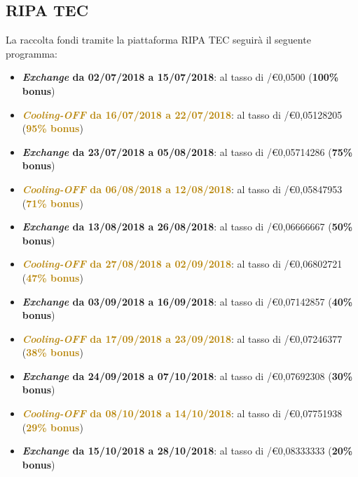 \subsection{RIPA TEC}
La raccolta fondi tramite la piattaforma RIPA TEC seguirà il seguente programma:
\begin{itemize}
	\item \textcolor{airforceblue}{\textbf{\textit{Exchange} da 02/07/2018 a 15/07/2018}}: al tasso di \PHP/\euro0,0500 (\textcolor{airforceblue}{\textbf{100\% bonus}})
	\item \textcolor{darkgoldenrod}{\textbf{\textit{Cooling-OFF} da 16/07/2018 a 22/07/2018}}: 
	al tasso di \PHP/\euro0,05128205 (\textcolor{darkgoldenrod}{\textbf{95\% bonus}})
	\item \textcolor{airforceblue}{\textbf{\textit{Exchange} da 23/07/2018 a 05/08/2018}}: al tasso di \PHP/\euro0,05714286 (\textcolor{airforceblue}{\textbf{75\% bonus}})
	\item \textcolor{darkgoldenrod}{\textbf{\textit{Cooling-OFF} da 06/08/2018 a 12/08/2018}}: 
	al tasso di \PHP/\euro0,05847953 (\textcolor{darkgoldenrod}{\textbf{71\% bonus}})
	\item \textcolor{airforceblue}{\textbf{\textit{Exchange} da 13/08/2018 a 26/08/2018}}: al tasso di \PHP/\euro0,06666667 (\textcolor{airforceblue}{\textbf{50\% bonus}})
	\item \textcolor{darkgoldenrod}{\textbf{\textit{Cooling-OFF} da 27/08/2018 a 02/09/2018}}: 
	al tasso di \PHP/\euro0,06802721 (\textcolor{darkgoldenrod}{\textbf{47\% bonus}})
	\item \textcolor{airforceblue}{\textbf{\textit{Exchange} da 03/09/2018 a 16/09/2018}}: al tasso di \PHP/\euro0,07142857 (\textcolor{airforceblue}{\textbf{40\% bonus}})
	\item \textcolor{darkgoldenrod}{\textbf{\textit{Cooling-OFF} da 17/09/2018 a 23/09/2018}}: 
	al tasso di \PHP/\euro0,07246377 (\textcolor{darkgoldenrod}{\textbf{38\% bonus}})
	\item \textcolor{airforceblue}{\textbf{\textit{Exchange} da 24/09/2018 a 07/10/2018}}: al tasso di \PHP/\euro0,07692308 (\textcolor{airforceblue}{\textbf{30\% bonus}})
	\item \textcolor{darkgoldenrod}{\textbf{\textit{Cooling-OFF} da 08/10/2018 a 14/10/2018}}: 
	al tasso di \PHP/\euro0,07751938 (\textcolor{darkgoldenrod}{\textbf{29\% bonus}})
	\item \textcolor{airforceblue}{\textbf{\textit{Exchange} da 15/10/2018 a 28/10/2018}}: al tasso di \PHP/\euro0,08333333 (\textcolor{airforceblue}{\textbf{20\% bonus}})

\end{itemize}
